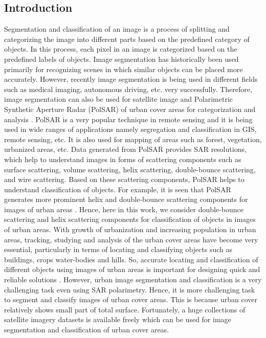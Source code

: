 \documentclass[a4paper,12pt]{spieman}  %
\begin{document}
\begin{spacing}{1}   %
\section{Introduction}
\label{sect:intro}  %
Segmentation and classification of an image is a process of splitting and categorizing the image into different parts based on the predefined category of objects. In this process, each pixel in an image is categorized based on the predefined labels of objects. Image segmentation has historically been used primarily for recognizing scenes in which similar objects can be placed more accurately. However, recently image segmentation is being used in different fields such as medical imaging, autonomous driving, etc. very successfully. Therefore, image segmentation can also be used for satellite image and Polarimetric Synthetic Aperture Radar (PolSAR) of urban cover areas for categorization and analysis \cite{niu2012context, taghanaki2021deep}.
PolSAR is a very popular technique in remote sensing and it is being used in wide ranges of applications namely segregation and classification in GIS, remote sensing, etc. It is also used for mapping of areas such as forest, vegetation, urbanized areas, etc. Data generated from PolSAR provides SAR resolutions, which help to understand images in forms of scattering components such as surface scattering, volume scattering, helix scattering, double-bounce scattering, and wire scattering. Based on these scattering components, PolSAR helps to understand classification of objects. For example,  it is seen that PolSAR generates more prominent helix and double-bounce scattering components for images of urban areas  \cite{zhou2018multi, chen2018polsar, zhang2015land}. Hence, here in this work, we consider double-bounce scattering and helix scattering components for classification of objects in images of urban areas.
With growth of urbanization and increasing population in urban areas, tracking, studying and analysis of the urban cover areas have become very essential, particularly in terms of locating and classifying objects such as buildings, crops water-bodies and hills. So, accurate locating and classification of different objects using images of urban areas is important for designing quick and reliable solutions \cite{de2017novel}. However, urban image segmentation and classification is a very challenging task even using SAR polarimetry. Hence, it is more challenging task to segment and classify images of urban cover areas. This is because urban cover relatively shows small part of total surface. Fortunately, a huge collections of satellite imagery datasets is available freely which can be used for image segmentation and classification of urban cover areas.

\end{spacing}
\end{document}
